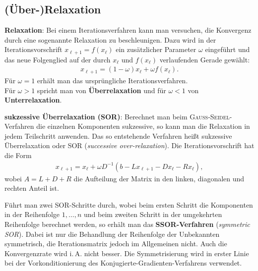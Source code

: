 \subsection{%
    (Über-)Relaxation%
}

\textbf{Relaxation}:
Bei einem Iterationsverfahren kann man versuchen, die Konvergenz durch
eine sogenannte Relaxation zu beschleunigen.
Dazu wird in der Iterationsvorschrift $x_{\ell+1} = f(x_\ell)$ ein zusätzlicher
Parameter $\omega$ eingeführt und das neue Folgenglied auf der durch
$x_\ell$ und $f(x_\ell)$ verlaufenden Gerade gewählt:
\begin{align*}
    x_{\ell+1} = (1 - \omega)x_\ell + \omega f(x_\ell).
\end{align*}
Für $\omega = 1$ erhält man das ursprüngliche Iterationsverfahren. \\
Für $\omega > 1$ spricht man von \textbf{Überrelaxation} und für $\omega < 1$
von \textbf{Unterrelaxation}.

\linie

\textbf{sukzessive Überrelaxation (SOR)}:
Berechnet man beim \textsc{Gauß}-\textsc{Seidel}-Verfahren die einzelnen
Komponenten sukzessive, so kann man die Relaxation in jedem Teilschritt
anwenden.
Das so entstehende Verfahren heißt sukzessive Überrelaxation oder SOR
(\emph{successive over-relaxation}).
Die Iterationsvorschrift hat die Form
\begin{align*}
    x_{\ell+1}
    = x_\ell + \omega D^{-1}(b - Lx_{\ell+1} - Dx_\ell - Rx_\ell),
\end{align*}
wobei $A = L + D + R$ die Aufteilung der Matrix in den linken, diagonalen
und rechten Anteil ist.

Führt man zwei SOR-Schritte durch, wobei beim ersten Schritt die Komponenten
in der Reihenfolge $1, \dotsc, n$ und beim zweiten Schritt in der umgekehrten
Reihenfolge berechnet werden, so erhält man das
\textbf{SSOR-Verfahren} (\emph{symmetric SOR}).
Dabei ist nur die Behandlung der Reihenfolge der Unbekannten symmetrisch,
die Iterationsmatrix jedoch im Allgemeinen nicht.
Auch die Konvergenzrate wird i.\,A. nicht besser.
Die Symmetrisierung wird in erster Linie bei der Vorkonditionierung des
Konjugierte-Gradienten-Verfahrens verwendet.
